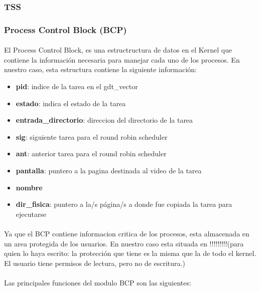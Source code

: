 \documentclass[11pt, a4paper]{article}
\begin{document}
\subsubsection{TSS}

\subsubsection{Process Control Block (BCP) }

\paragraph{}
El Process Control Block, es una estructructura de datos en el Kernel que contiene la información necesaria para manejar cada uno de los procesos.
En nuestro caso, esta estructura contiene la siguiente información:
\begin{itemize}
\item \textbf{pid}: indice de la tarea en el gdt\_vector
\item \textbf{estado}: indica el estado de la tarea
\item \textbf{entrada\_directorio}: direccion del directorio de la tarea
\item \textbf{sig}: siguiente tarea para el round robin scheduler
\item \textbf{ant}: anterior tarea para el round robin scheduler
\item \textbf{pantalla}: puntero a la pagina destinada al video de la tarea
\item \textbf{nombre}
\item \textbf{dir\_fisica}: puntero a la/s página/s a donde fue copiada la tarea para ejecutarse
\end{itemize}

\paragraph{}
Ya que el BCP contiene informacion critica de los procesos, esta almacenada en un area protegida de los usuarios. En nuestro caso esta situada en !!!!!!!!!(para quien lo haya escrito: la protección que tiene es la misma que la de todo el kernel. El usuario tiene permisos de lectura, pero no de escritura.)

\paragraph{}
Las principales funciones del modulo BCP son las siguientes:
\end{document}

